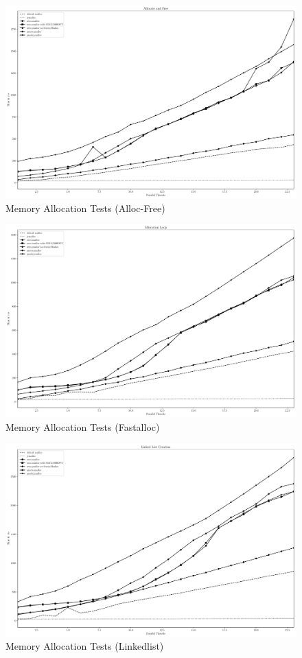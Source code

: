 \begin{figure}
    \centering
    \caption{Memory Allocation Tests (Alloc-Free)}\label{plot:af}
    \includegraphics[scale=0.35]{malloc/alloc_free.pdf}
\end{figure}

\begin{figure}
    \centering
    \caption{Memory Allocation Tests (Fastalloc)}\label{plot:fastalloc}
    \includegraphics[scale=0.35]{malloc/fastalloc.pdf}
\end{figure}

\begin{figure}
    \centering
    \caption{Memory Allocation Tests (Linkedlist)}\label{plot:linkedlist}
    \includegraphics[scale=0.35]{malloc/linkedlist.pdf}
\end{figure}


